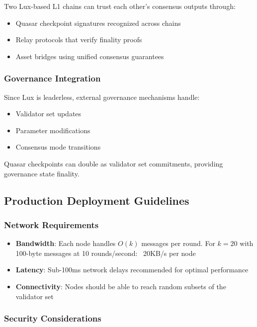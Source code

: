 Two Lux-based L1 chains can trust each other's consensus outputs through:
\begin{itemize}
\item Quasar checkpoint signatures recognized across chains
\item Relay protocols that verify finality proofs
\item Asset bridges using unified consensus guarantees
\end{itemize}

\subsubsection{Governance Integration}

Since Lux is leaderless, external governance mechanisms handle:
\begin{itemize}
\item Validator set updates
\item Parameter modifications  
\item Consensus mode transitions
\end{itemize}

Quasar checkpoints can double as validator set commitments, providing governance state finality.

\subsection{Production Deployment Guidelines}

\subsubsection{Network Requirements}

\begin{itemize}
\item \textbf{Bandwidth}: Each node handles $O(k)$ messages per round. For $k=20$ with 100-byte messages at 10 rounds/second: ~20KB/s per node
\item \textbf{Latency}: Sub-100ms network delays recommended for optimal performance
\item \textbf{Connectivity}: Nodes should be able to reach random subsets of the validator set
\end{itemize}

\subsubsection{Security Considerations}

